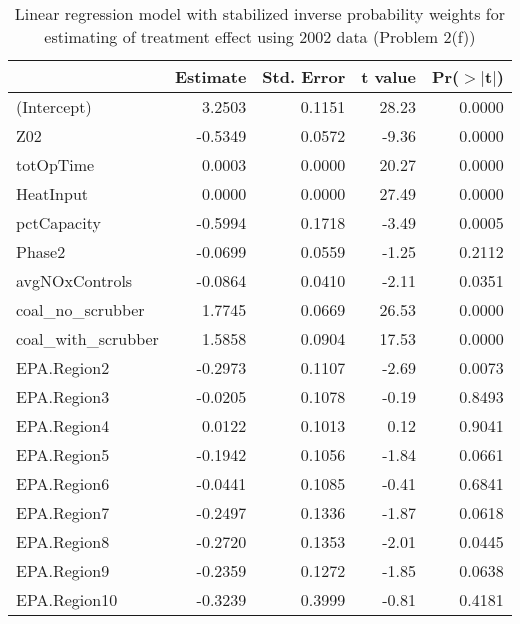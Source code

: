 \begin{table}[ht]
\centering
\begin{tabular}{lrrrr}
  \toprule
 & Estimate & Std. Error & t value & Pr($>$$|$t$|$) \\ 
  \midrule
(Intercept) & 3.2503 & 0.1151 & 28.23 & 0.0000 \\ 
  Z02 & -0.5349 & 0.0572 & -9.36 & 0.0000 \\ 
  totOpTime & 0.0003 & 0.0000 & 20.27 & 0.0000 \\ 
  HeatInput & 0.0000 & 0.0000 & 27.49 & 0.0000 \\ 
  pctCapacity & -0.5994 & 0.1718 & -3.49 & 0.0005 \\ 
  Phase2 & -0.0699 & 0.0559 & -1.25 & 0.2112 \\ 
  avgNOxControls & -0.0864 & 0.0410 & -2.11 & 0.0351 \\ 
  coal\_no\_scrubber & 1.7745 & 0.0669 & 26.53 & 0.0000 \\ 
  coal\_with\_scrubber & 1.5858 & 0.0904 & 17.53 & 0.0000 \\ 
  EPA.Region2 & -0.2973 & 0.1107 & -2.69 & 0.0073 \\ 
  EPA.Region3 & -0.0205 & 0.1078 & -0.19 & 0.8493 \\ 
  EPA.Region4 & 0.0122 & 0.1013 & 0.12 & 0.9041 \\ 
  EPA.Region5 & -0.1942 & 0.1056 & -1.84 & 0.0661 \\ 
  EPA.Region6 & -0.0441 & 0.1085 & -0.41 & 0.6841 \\ 
  EPA.Region7 & -0.2497 & 0.1336 & -1.87 & 0.0618 \\ 
  EPA.Region8 & -0.2720 & 0.1353 & -2.01 & 0.0445 \\ 
  EPA.Region9 & -0.2359 & 0.1272 & -1.85 & 0.0638 \\ 
  EPA.Region10 & -0.3239 & 0.3999 & -0.81 & 0.4181 \\ 
   \bottomrule
\end{tabular}
\caption{Linear regression model with stabilized inverse probability
  weights for estimating of treatment effect using 2002 data (Problem
  2(f))}
\label{tab:lm-2f-02}
\end{table}

